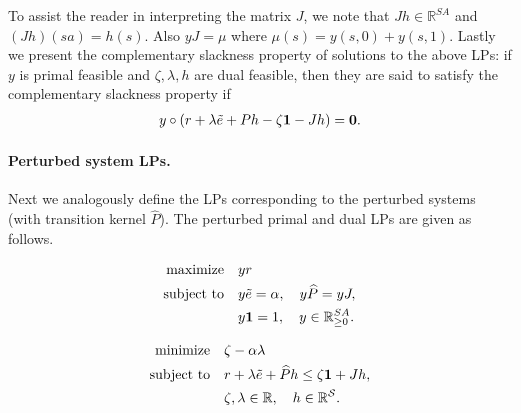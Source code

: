 \documentclass[mnsc,nonblindrev]{informs3}
\newcommand{\R}{\mathbb{R}}
\newcommand{\Phat}{\widehat{P}}
\newcommand{\one}{\mathbf{1}}
\newcommand{\States}{\mathcal{S}}
\newcommand{\zero}{\mathbf{0}}
\begin{document}
\par\vspace{1em}
To assist the reader in interpreting the matrix $J$, we note that $Jh \in \R^{SA}$ and $(Jh)(sa) = h(s)$. Also $yJ = \mu$ where $\mu(s) = y(s,0) + y(s,1)$.
Lastly we present the complementary slackness property of solutions to the above LPs: 
if $y$ is primal feasible and $\zeta, \lambda, h$ are dual feasible, then they are said to satisfy the complementary slackness property if
\begin{align}
    y \circ \left( r + \lambda \Tilde{e} + Ph - \zeta \one - J h \right) = \zero. \label{eq:LP_CS_true}
\end{align}

\paragraph{Perturbed system LPs.}
Next we analogously define the LPs corresponding to the perturbed systems
(with transition kernel $\Phat$). The perturbed primal and dual LPs are
given as follows.
\par\vspace{-0.5em}
\noindent
\begin{minipage}[t]{0.48\textwidth}
\setlength{\abovedisplayskip}{0pt}
\setlength{\abovedisplayshortskip}{0pt}
\vspace{0pt}
\vspace{-1.5em}
\begin{subequations}
\label{eq:primal_LP_pert}
\begin{align}
\text{maximize} \quad
    & yr \\
\text{subject to} \quad
    & y \Tilde{e} = \alpha,\quad y \Phat = y J, \\
    & y\one = 1,\quad y \in \R^{SA}_{\geq 0}\nonumber.
\end{align}
\end{subequations}
\end{minipage}
\hfill
\begin{minipage}[t]{0.48\textwidth}
\setlength{\abovedisplayskip}{0pt}
\setlength{\abovedisplayshortskip}{0pt}
\vspace{0pt}
\vspace{-1.5em}
\begin{subequations}
\label{eq:dual_LP_pert}
\begin{align}
\text{minimize} \quad
    & \zeta - \alpha \lambda \\
\text{subject to} \quad
    & r + \lambda \Tilde{e} + \Phat h
      \leq \zeta \one + J h, \label{eq:pert_dual_ineq} \\
    & \zeta, \lambda \in \R,\quad h \in \R^{\States}\nonumber.
\end{align}
\end{subequations}
\end{minipage}
\end{document}
